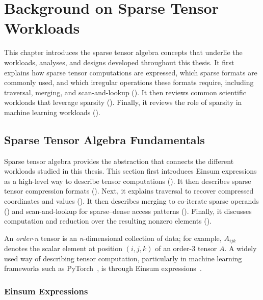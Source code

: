 \chapter{Background on Sparse Tensor Workloads} \label{sec:background}

This chapter introduces the sparse tensor algebra concepts that underlie the workloads, analyses, and designs developed throughout this thesis. It first explains how sparse tensor computations are expressed, which sparse formats are commonly used, and which irregular operations these formats require, including traversal, merging, and scan-and-lookup (). It then reviews common scientific workloads that leverage sparsity (). Finally, it reviews the role of sparsity in machine learning workloads ().

\section{Sparse Tensor Algebra Fundamentals} \label{sec:sparse-tensor-algebra-fundamentals} %

Sparse tensor algebra provides the abstraction that connects the different workloads studied in this thesis. This section first introduces Einsum expressions as a high-level way to describe tensor computations (). It then describes sparse tensor compression formats (). Next, it explains traversal to recover compressed coordinates and values (). It then describes merging to co-iterate sparse operands () and scan-and-lookup for sparse--dense access patterns (). Finally, it discusses computation and reduction over the resulting nonzero elements ().

An \emph{order}-\textit{n} tensor is an \textit{n}-dimensional collection of data; for example, $A_{ijk}$ denotes the scalar element at position $(i,j,k)$ of an order-3 tensor $A$. A widely used way of describing tensor computation, particularly in machine learning frameworks such as PyTorch~\cite{paszke2019neurips}, is through Einsum expressions~\cite{kjolstad2017oopsla}.

\subsection{Einsum Expressions} \label{sec:einsum-expressions} %

